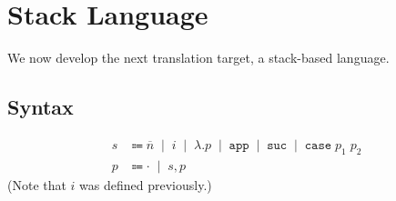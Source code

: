 \documentclass[12pt]{article}
\newcommand{\alt}{\;\; | \;\;}
\newcommand{\defi}{\Coloneqq}
\newcommand{\nil}{\cdot}
\newcommand{\h}[1]{\hat{#1}}
\renewcommand{\rule}{\textsc}
\newcommand{\sg}{\sigma}
\renewcommand{\phi}{\varphi}
\newcommand{\De}{\Delta}
\newcommand{\E}{\mathcal{E}}
\newcommand{\B}{\mathcal{B}}
\newcommand{\C}{\mathcal{C}}
\newcommand{\D}{\mathcal{D}}
\newcommand{\T}{\mathcal{T}}
\newcommand{\n}[1]{\overline{#1}}
\newcommand{\lam}[2]{\lambda #1. #2}
\newcommand{\app}{\;}
\newcommand{\sub}[3]{#1[#2/#3]}
\newcommand{\subs}[2]{#1[#2]}
\newcommand{\wo}{\backslash}
\newcommand{\sapp}{\mathtt{app}}
\newcommand{\ssuc}{\mathtt{suc}}
\newcommand{\scase}[2]{\mathtt{case} \; #1 \; #2}
\newcommand{\ninf}[1]{\AxiomC{#1}}
\newcommand{\uinf}[1]{\UnaryInfC{#1}}
\newcommand{\binf}[1]{\BinaryInfC{#1}}
\newcommand{\tinf}[1]{\TrinaryInfC{#1}}
\newcommand{\prem}[2]{\noLine \ninf{$#1$} \uinf{#2}}
\newcommand{\tra}[3]{\ensuremath{#1 \vdash #2 \rhd #3}}
\newcommand{\ev}[2]{\ensuremath{#1 \downarrow #2}}
\newcommand{\hev}[3]{\ensuremath{#1 \vdash #2 \Downarrow #3}}
\newcommand{\cor}[2]{\ensuremath{#1 \rightsquigarrow #2}}
\newcommand{\comp}[3]{\ensuremath{#1 \stackrel{#2}{\rightsquigarrow} #3}}
\newcommand{\e}{e} %
\renewcommand{\c}{c} %
\renewcommand{\b}{b} %
\renewcommand{\v}{v} %
\newcommand{\s}{s}
\renewcommand{\ss}{p} %
\renewcommand{\h}{h}
\newenvironment{proof}[1][Proof]{
\paragraph{#1}
}{
\begin{flushright}
$\blacksquare$
\end{flushright}
}
\begin{document}
%
%
%
%
%
%

\section*{Stack Language}

We now develop the next translation target, a stack-based language.

\subsection*{Syntax}
\begin{align*}
  \s &\defi \n{n} \alt i \alt \lam{}{\ss} \alt \sapp \alt \ssuc \alt \scase{\ss_1}{\ss_2} \\
  \ss &\defi \nil \alt \s, \ss
\end{align*}
(Note that $i$ was defined previously.)
\end{document}
